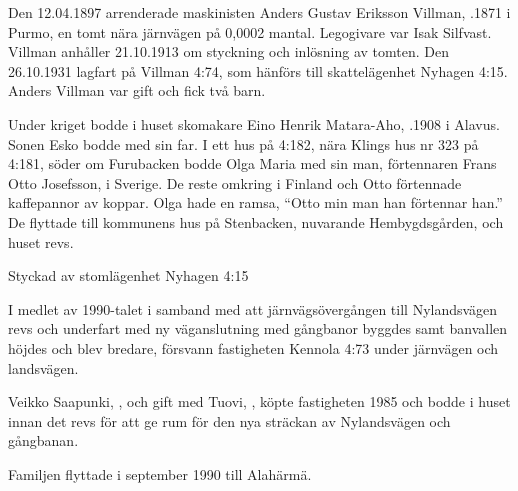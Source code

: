 %
Den 12.04.1897 arrenderade maskinisten Anders Gustav Eriksson Villman, .1871 i Purmo, en tomt nära järnvägen på 0,0002	mantal. Legogivare var Isak Silfvast. Villman anhåller 21.10.1913 om styckning och inlösning av tomten. Den 26.10.1931 lagfart på Villman	4:74, som hänförs till skattelägenhet Nyhagen 4:15. Anders Villman var gift och fick två barn.
\begin{jhchildren}
  \item {}
  \item {}
\end{jhchildren}
Under kriget bodde i huset skomakare Eino Henrik Matara-Aho, .1908 i Alavus. Sonen Esko bodde med sin far. I ett hus på 4:182, nära Klings hus nr 323 på 4:181, söder om Furubacken bodde Olga Maria med sin man, förtennaren Frans Otto Josefsson,  i Sverige. De reste omkring i Finland och Otto förtennade kaffepannor av koppar. Olga hade en ramsa, ``Otto min man han förtennar han.'' De flyttade till kommunens hus på Stenbacken, nuvarande Hembygdsgården, och huset revs.



%

Styckad av stomlägenhet Nyhagen 4:15


%
I medlet av 1990-talet i samband med att järnvägsövergången till Nylandsvägen revs och underfart med ny väganslutning med gångbanor byggdes samt banvallen höjdes och blev bredare, försvann fastigheten Kennola 4:73 under järnvägen och landsvägen.


%
Veikko Saapunki, , och gift med Tuovi, , köpte fastigheten 1985 och bodde i huset innan det revs för att ge rum för den nya sträckan av Nylandsvägen och gångbanan.
\begin{jhchildren}
  \item {}
  \item {}
\end{jhchildren}
Familjen flyttade i september 1990 till Alahärmä.


